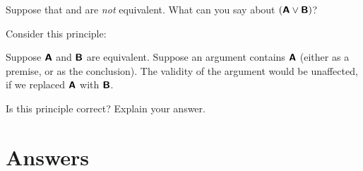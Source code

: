 \begin{small}
\begin{earg}
\item Suppose that  and  are \emph{not} equivalent. What can you say about $(\bm{\mathsf{A}}\vee\bm{\mathsf{B}})$?

\item Consider this principle:
	\begin{ebullet}
		\item[] Suppose $\bm{\mathsf{A}}$ and $\bm{\mathsf{B}}$ are equivalent. Suppose an argument contains $\bm{\mathsf{A}}$ (either as a premise, or as the conclusion). The validity of the argument would be unaffected, if we replaced $\bm{\mathsf{A}}$ with $\bm{\mathsf{B}}$.
	\end{ebullet}
Is this principle correct? Explain your answer.
\end{earg}





\newpage

\section{Answers}
\setcounter{ProbPart}{0}

\end{small}
